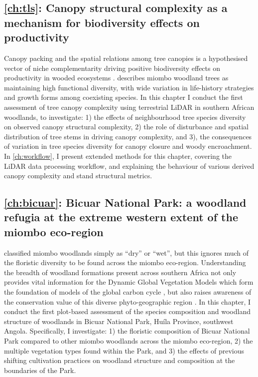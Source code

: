 \begin{refsection}
\subsection{\autoref{ch:tls}: Canopy structural complexity as a mechanism for biodiversity effects on productivity}
\label{intro:ssec:ch:tls}

Canopy packing and the spatial relations among tree canopies is a hypothesised vector of niche complementarity driving positive biodiversity effects on productivity in wooded ecosystems \citep{Jucker2015, Oehri2020}. \citet{Frost1996} describes miombo woodland trees as maintaining high functional diversity, with wide variation in life-history strategies and growth forms among coexisting species. In this chapter I conduct the first assessment of tree canopy complexity using terrestrial LiDAR in southern African woodlands, to investigate: 1) the effects of neighbourhood tree species diversity on observed canopy structural complexity, 2) the role of disturbance and spatial distribution of tree stems in driving canopy complexity, and 3), the consequences of variation in tree species diversity for canopy closure and woody encroachment. In \autoref{ch:workflow}, I present extended methods for this chapter, covering the LiDAR data processing workflow, and explaining the behaviour of various derived canopy complexity and stand structural metrics.

\subsection{\autoref{ch:bicuar}: Bicuar National Park: a woodland refugia at the extreme western extent of the miombo eco-region}
\label{intro:ssec:ch:bicuar}

\citet{White1983} classified miombo woodlands simply as ``dry'' or ``wet'', but this ignores much of the floristic diversity to be found across the miombo eco-region. Understanding the breadth of woodland formations present across southern Africa not only provides vital information for the Dynamic Global Vegetation Models which form the foundation of models of the global carbon cycle \citep{Conradi2020}, but also raises awareness of the conservation value of this diverse phyto-geographic region \citep{Jew2016}. In this chapter, I conduct the first plot-based assessment of the species composition and woodland structure of woodlands in Bicuar National Park, Hu\'{i}la Province, southwest Angola. Specifically, I investigate: 1) the floristic composition of Bicuar National Park compared to other miombo woodlands across the miombo eco-region, 2) the multiple vegetation types found within the Park, and 3) the effects of previous shifting cultivation practices on woodland structure and composition at the boundaries of the Park.


\end{refsection}
